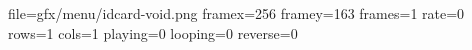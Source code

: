 file=gfx/menu/idcard-void.png
framex=256
framey=163
frames=1
rate=0
rows=1
cols=1
playing=0
looping=0
reverse=0